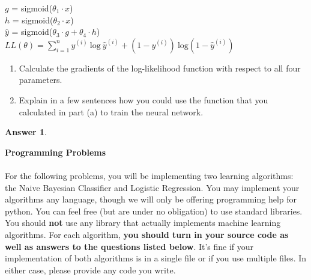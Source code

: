 \documentclass[12pt]{article}
\renewcommand{\(}{\left(}
\renewcommand{\)}{\right)}
\theoremstyle{definition}
\newtheorem*{answer}{Answer}
\begin{document}
\begin{enumerate}
{\begin{center}
    
    $g$ = sigmoid($\theta_1 \cdot x$)\\
    $h$ = sigmoid($\theta_2 \cdot x$)\\
    $\hat{y}$ = sigmoid($\theta_3 \cdot g + \theta_4 \cdot h$)\\
    $LL(\theta) = \displaystyle \sum_{i=1}^n y^{(i)}\ \text{log}\ \hat{y}^{(i)} + (1 - y^{(i)})\ \text{log} (1 - \hat{y}^{(i)})$
    \end{center}
    
    \begin{enumerate}
        \item Calculate the gradients of the log-likelihood function with respect to all four parameters.
        \item Explain in a few sentences how you could use the function that you calculated in part (a) to train the neural network. 
    \end{enumerate}
    
    \begin{shaded}
    \begin{answer}
    
    \end{answer}
    \end{shaded}
    \newpage
    
    \textbf{Programming Problems}\\ \\
    \small{
    For the following problems, you will be implementing two learning algorithms: the Naive Bayesian Classifier and Logistic Regression. You may implement your algorithms any language, though we will only be offering programming help for python. You can feel free (but are under no obligation) to use standard libraries. You should \textbf{not} use any library that actually implements machine learning algorithms. For each algorithm, \textbf{you should turn in your source code as well as answers to the questions listed below}. It's fine if your implementation of both algorithms is in a single file or if you use multiple files. In either case, please provide any code you write.\\
    
}}
\end{enumerate}
\end{document}
